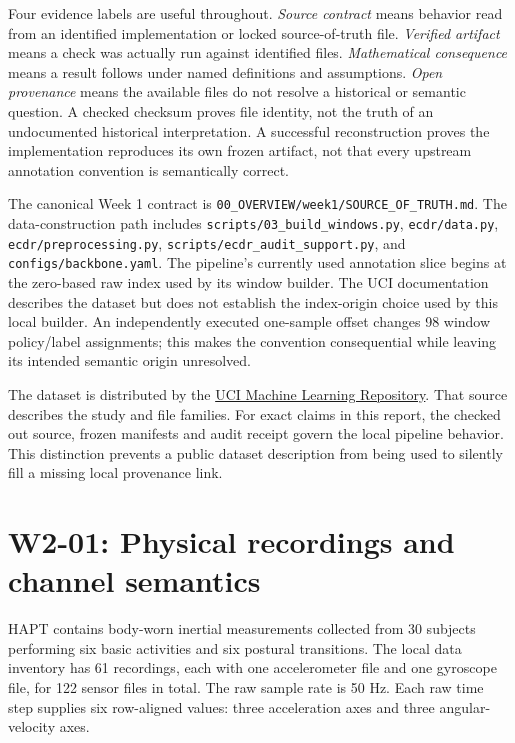 \documentclass[11pt,a4paper]{article}
\newcommand{\code}[1]{{\small\ttfamily\nolinkurl{#1}}}
\begin{document}
Four evidence labels are useful throughout. \emph{Source contract} means behavior read from an identified implementation or locked source-of-truth file. \emph{Verified artifact} means a check was actually run against identified files. \emph{Mathematical consequence} means a result follows under named definitions and assumptions. \emph{Open provenance} means the available files do not resolve a historical or semantic question. A checked checksum proves file identity, not the truth of an undocumented historical interpretation. A successful reconstruction proves the implementation reproduces its own frozen artifact, not that every upstream annotation convention is semantically correct.

The canonical Week 1 contract is \code{00_OVERVIEW/week1/SOURCE_OF_TRUTH.md}. The data-construction path includes \code{scripts/03_build_windows.py}, \code{ecdr/data.py}, \code{ecdr/preprocessing.py}, \code{scripts/ecdr_audit_support.py}, and \code{configs/backbone.yaml}. The pipeline's currently used annotation slice begins at the zero-based raw index used by its window builder. The UCI documentation describes the dataset but does not establish the index-origin choice used by this local builder. An independently executed one-sample offset changes 98 window policy/label assignments; this makes the convention consequential while leaving its intended semantic origin unresolved.

The dataset is distributed by the \href{https://archive.ics.uci.edu/dataset/341/smartphone+based+recognition+of+human+activities+and+postural+transitions}{UCI Machine Learning Repository}. That source describes the study and file families. For exact claims in this report, the checked out source, frozen manifests and audit receipt govern the local pipeline behavior. This distinction prevents a public dataset description from being used to silently fill a missing local provenance link.

\section{W2-01: Physical recordings and channel semantics}
HAPT contains body-worn inertial measurements collected from 30 subjects performing six basic activities and six postural transitions. The local data inventory has 61 recordings, each with one accelerometer file and one gyroscope file, for 122 sensor files in total. The raw sample rate is 50 Hz. Each raw time step supplies six row-aligned values: three acceleration axes and three angular-velocity axes.
\end{document}
